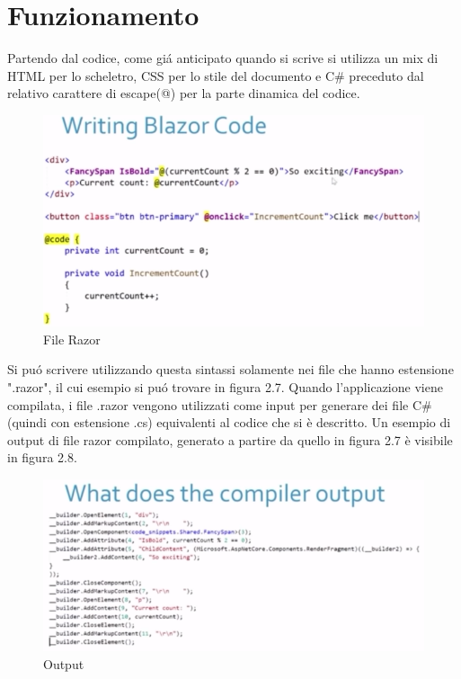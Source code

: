 \section{Funzionamento}\label{sez:funzionamento}
Partendo dal codice, come gi\'a anticipato quando si scrive si utilizza un mix di HTML per lo scheletro, CSS per lo stile del documento e C\# preceduto dal relativo carattere di escape(@) per la parte dinamica del codice.
\begin{figure}[H]
	\centerline{\includegraphics[scale=0.7]{figure/RazorFile.png}}
	\caption{File Razor\cite{ryanNowakNDCSydney}}
	\label{fig:razorFile}
\end{figure}
Si pu\'o scrivere utilizzando questa sintassi solamente nei file che hanno estensione ".razor", il cui esempio si pu\'o trovare in figura 2.7.
Quando l'applicazione viene compilata, i file .razor vengono utilizzati come input per generare dei file C\#(quindi con estensione .cs) equivalenti al codice che si \`e descritto.\cite{ryanNowakNDCSydney}
Un esempio di output di file razor compilato, generato a partire da quello in figura 2.7 \`e visibile in figura 2.8.
\begin{figure}[H]
	\centerline{\includegraphics[scale=0.75]{figure/RazorFileCompiled.PNG}}
	\caption{Output\cite{ryanNowakNDCSydney}}
	\label{fig:compiledRazorFile}
\end{figure}

